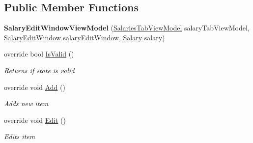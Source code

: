 \subsection*{Public Member Functions}
\begin{DoxyCompactItemize}
\item 
\hypertarget{class_baudi_1_1_client_1_1_view_models_1_1_edit_window_view_models_1_1_salary_edit_window_view_model_a467b89a4831ee1acf816a18e62acb53e}{}{\bfseries Salary\+Edit\+Window\+View\+Model} (\hyperlink{class_baudi_1_1_client_1_1_view_models_1_1_tabs_view_models_1_1_salaries_tab_view_model}{Salaries\+Tab\+View\+Model} salary\+Tab\+View\+Model, \hyperlink{class_baudi_1_1_client_1_1_view_1_1_edit_windows_1_1_salary_edit_window}{Salary\+Edit\+Window} salary\+Edit\+Window, \hyperlink{class_baudi_1_1_d_a_l_1_1_models_1_1_salary}{Salary} salary)\label{class_baudi_1_1_client_1_1_view_models_1_1_edit_window_view_models_1_1_salary_edit_window_view_model_a467b89a4831ee1acf816a18e62acb53e}

\item 
override bool \hyperlink{class_baudi_1_1_client_1_1_view_models_1_1_edit_window_view_models_1_1_salary_edit_window_view_model_a375f2c42ab83bb3d21388a555ecc1b82}{Is\+Valid} ()
\begin{DoxyCompactList}\small\item\em Returns if state is valid \end{DoxyCompactList}\item 
override void \hyperlink{class_baudi_1_1_client_1_1_view_models_1_1_edit_window_view_models_1_1_salary_edit_window_view_model_a0b08a657c9f228f0ff84cafe2ce16d41}{Add} ()
\begin{DoxyCompactList}\small\item\em Adds new item \end{DoxyCompactList}\item 
override void \hyperlink{class_baudi_1_1_client_1_1_view_models_1_1_edit_window_view_models_1_1_salary_edit_window_view_model_aa474329edaea7b5e57089995cb532c05}{Edit} ()
\begin{DoxyCompactList}\small\item\em Edits item \end{DoxyCompactList}\end{DoxyCompactItemize}
